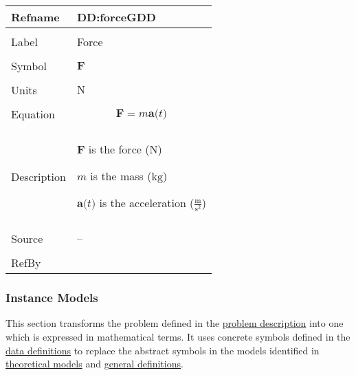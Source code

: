 \documentclass[12pt]{article}
\begin{document}
\vspace{\baselineskip}
\noindent
\begin{minipage}{\textwidth}
\begin{tabular}{>{\raggedright}p{}>{\raggedright\arraybackslash}p{}}
\toprule \textbf{Refname} & \textbf{DD:forceGDD}
\label{DD:forceGDD}
\\ \midrule \\
Label & Force
        
\\ \midrule \\
Symbol & $\symbf{F}$
         
\\ \midrule \\
Units & ${\text{N}}$
        
\\ \midrule \\
Equation & \begin{displaymath}
           \symbf{F}=m \symbf{a}\text{(}t\text{)}
           \end{displaymath}
\\ \midrule \\
Description & \begin{symbDescription}
              \item{$\symbf{F}$ is the force (${\text{N}}$)}
              \item{$m$ is the mass (${\text{kg}}$)}
              \item{$\symbf{a}\text{(}t\text{)}$ is the acceleration ($\frac{\text{m}}{\text{s}^{2}}$)}
              \end{symbDescription}
\\ \midrule \\
Source & --
         
\\ \midrule \\
RefBy & 
\\ \bottomrule
\end{tabular}
\end{minipage}

\subsubsection{Instance Models}
\label{Sec:IMs}
This section transforms the problem defined in the \hyperref[Sec:ProbDesc]{problem description} into one which is expressed in mathematical terms. It uses concrete symbols defined in the \hyperref[Sec:DDs]{data definitions} to replace the abstract symbols in the models identified in \hyperref[Sec:TMs]{theoretical models} and \hyperref[Sec:GDs]{general definitions}.
\end{document}
